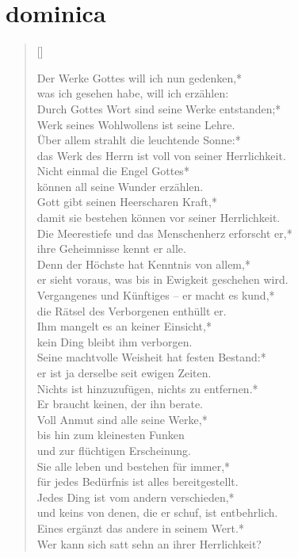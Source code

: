 \section{dominica}

\begin{verse}[\versewidth]

Der Werke Gottes will ich nun gedenken,*\\
was ich gesehen habe, will ich erzählen:\\
\vin Durch Gottes Wort sind seine Werke entstanden;*\\
\vin Werk seines Wohlwollens ist seine Lehre.\\
Über allem strahlt die leuchtende Sonne:*\\
das Werk des Herrn ist voll von seiner Herrlichkeit.\\
\vin Nicht einmal die Engel Gottes*\\
\vin können all seine Wunder erzählen.\\ 
Gott gibt seinen Heerscharen Kraft,*\\
damit sie bestehen können vor seiner Herrlichkeit.\\
\vin Die Meerestiefe und das Menschenherz erforscht er,*\\
\vin ihre Geheimnisse kennt er alle.\\
Denn der Höchste hat Kenntnis von allem,*\\
er sieht voraus, was bis in Ewigkeit geschehen wird.\\
\vin Vergangenes und Künftiges – er macht es kund,*\\
\vin die Rätsel des Verborgenen enthüllt er.\\
Ihm mangelt es an keiner Einsicht,*\\
kein Ding bleibt ihm verborgen.\\
\vin Seine machtvolle Weisheit hat festen Bestand:*\\
\vin er ist ja derselbe seit ewigen Zeiten.\\
Nichts ist hinzuzufügen, nichts zu entfernen.*\\
Er braucht keinen, der ihn berate.\\
\vin Voll Anmut sind alle seine Werke,*\\
\vin bis hin zum kleinesten Funken\\
\vin und zur flüchtigen Erscheinung.\\
Sie alle leben und bestehen für immer,*\\
für jedes Bedürfnis ist alles bereitgestellt.\\
\vin Jedes Ding ist vom andern verschieden,*\\
\vin und keins von denen, die er schuf, ist entbehrlich.\\
Eines ergänzt das andere in seinem Wert.*\\
Wer kann sich satt sehn an ihrer Herrlichkeit?\\


\end{verse}

